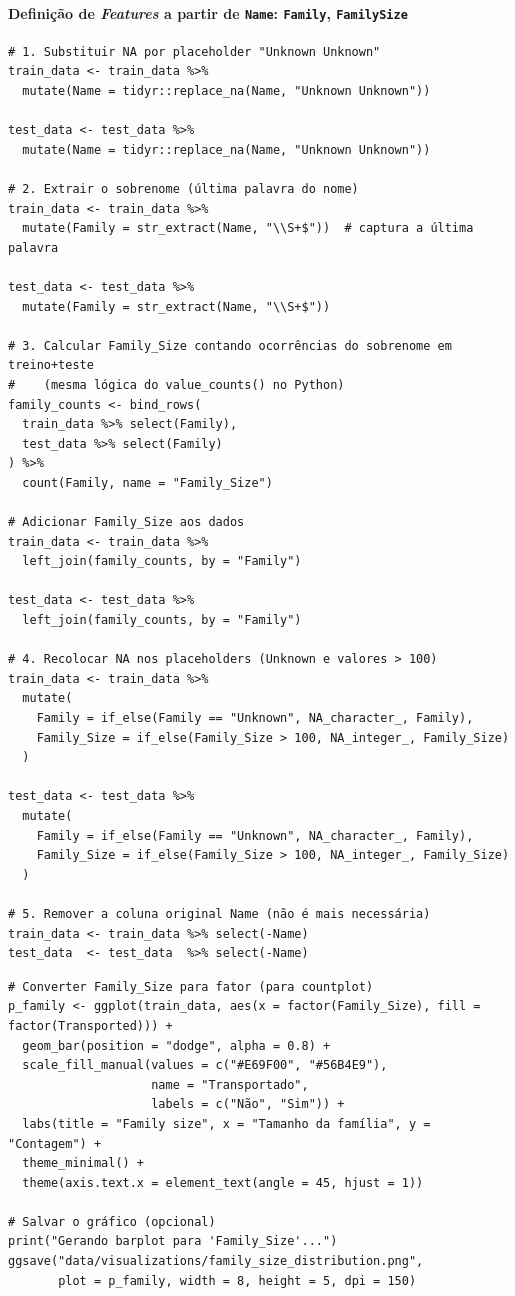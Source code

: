 \documentclass[12pt,a4paper]{article}
\begin{document}
\paragraph{Definição de \emph{Features} a partir de \texttt{Name}: \texttt{Family}, \texttt{FamilySize}}
\label{sec:orgf685398}
\begin{verbatim}
# 1. Substituir NA por placeholder "Unknown Unknown"
train_data <- train_data %>%
  mutate(Name = tidyr::replace_na(Name, "Unknown Unknown"))

test_data <- test_data %>%
  mutate(Name = tidyr::replace_na(Name, "Unknown Unknown"))

# 2. Extrair o sobrenome (última palavra do nome)
train_data <- train_data %>%
  mutate(Family = str_extract(Name, "\\S+$"))  # captura a última palavra

test_data <- test_data %>%
  mutate(Family = str_extract(Name, "\\S+$"))

# 3. Calcular Family_Size contando ocorrências do sobrenome em treino+teste
#    (mesma lógica do value_counts() no Python)
family_counts <- bind_rows(
  train_data %>% select(Family),
  test_data %>% select(Family)
) %>%
  count(Family, name = "Family_Size")

# Adicionar Family_Size aos dados
train_data <- train_data %>%
  left_join(family_counts, by = "Family")

test_data <- test_data %>%
  left_join(family_counts, by = "Family")

# 4. Recolocar NA nos placeholders (Unknown e valores > 100)
train_data <- train_data %>%
  mutate(
    Family = if_else(Family == "Unknown", NA_character_, Family),
    Family_Size = if_else(Family_Size > 100, NA_integer_, Family_Size)
  )

test_data <- test_data %>%
  mutate(
    Family = if_else(Family == "Unknown", NA_character_, Family),
    Family_Size = if_else(Family_Size > 100, NA_integer_, Family_Size)
  )

# 5. Remover a coluna original Name (não é mais necessária)
train_data <- train_data %>% select(-Name)
test_data  <- test_data  %>% select(-Name)
\end{verbatim}


\begin{verbatim}
# Converter Family_Size para fator (para countplot)
p_family <- ggplot(train_data, aes(x = factor(Family_Size), fill = factor(Transported))) +
  geom_bar(position = "dodge", alpha = 0.8) +
  scale_fill_manual(values = c("#E69F00", "#56B4E9"), 
                    name = "Transportado",
                    labels = c("Não", "Sim")) +
  labs(title = "Family size", x = "Tamanho da família", y = "Contagem") +
  theme_minimal() +
  theme(axis.text.x = element_text(angle = 45, hjust = 1))

# Salvar o gráfico (opcional)
print("Gerando barplot para 'Family_Size'...")
ggsave("data/visualizations/family_size_distribution.png", 
       plot = p_family, width = 8, height = 5, dpi = 150)
\end{verbatim}
\end{document}
